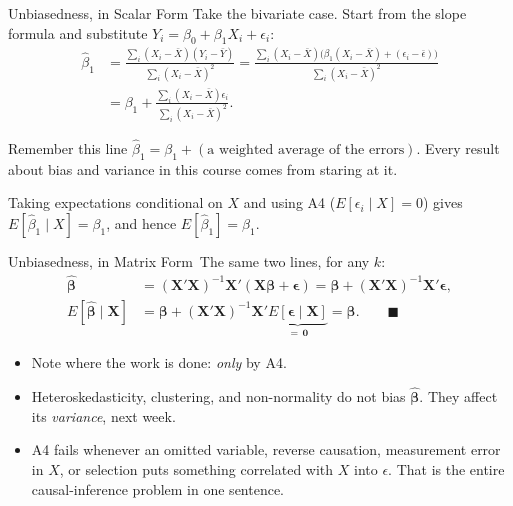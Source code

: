 \documentclass[aspectratio=169,11pt,xcolor=dvipsnames]{beamer}
\newcommand{\E}{E}
\newcommand{\X}{\bm{X}}
\newcommand{\zero}{\bm{0}}
\newcommand{\bhat}{\hat{\bm{\beta}}}
\newcommand{\adv}{\,\raisebox{0.6pt}{\textcolor{accent}{$\bigstar$}}}
\begin{document}
\begin{frame}{Unbiasedness, in Scalar Form}
Take the bivariate case. Start from the slope formula and substitute
$Y_i = \beta_0+\beta_1X_i+\epsilon_i$:
\begin{align*}
  \hat\beta_1
  &= \frac{\sum_i (X_i-\bar X)(Y_i - \bar Y)}{\sum_i (X_i - \bar X)^2}
   = \frac{\sum_i (X_i-\bar X)\big(\beta_1(X_i - \bar X) + (\epsilon_i - \bar\epsilon)\big)}
          {\sum_i (X_i - \bar X)^2} \\[4pt]
  &= \beta_1 + \frac{\sum_i (X_i - \bar X)\epsilon_i}{\sum_i (X_i-\bar X)^2} .
\end{align*}
\pause
\begin{alertblock}{Remember this line}
$\hat\beta_1 = \beta_1 + (\text{a weighted average of the errors})$. Every result
about bias and variance in this course comes from staring at it.
\end{alertblock}
Taking expectations conditional on $X$ and using A4 ($\E[\epsilon_i\mid X]=0$)
gives $\E[\hat\beta_1\mid X]=\beta_1$, and hence $\E[\hat\beta_1]=\beta_1$.
\end{frame}

\begin{frame}{Unbiasedness, in Matrix Form\adv}
The same two lines, for any $k$:
\begin{align*}
  \bhat &= (\X'\X)^{-1}\X'(\X\bm\beta + \bm\epsilon)
         = \bm\beta + (\X'\X)^{-1}\X'\bm\epsilon , \\[4pt]
  \E[\bhat\mid\X] &= \bm\beta + (\X'\X)^{-1}\X'\underbrace{\E[\bm\epsilon\mid\X]}_{=\,\zero}
  = \bm\beta . \qquad\blacksquare
\end{align*}
\vskip6pt
\begin{itemize}
  \item Note where the work is done: \emph{only} by A4.
  \item Heteroskedasticity, clustering, and non-normality do \alert{not} bias
        $\bhat$. They affect its \emph{variance}, next week.
  \item A4 fails whenever an omitted variable, reverse causation, measurement
        error in $X$, or selection puts something correlated with $X$ into
        $\epsilon$. That is the entire causal-inference problem in one sentence.
\end{itemize}
\end{frame}
\end{document}
